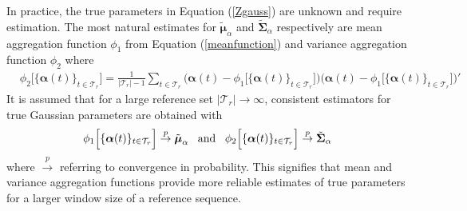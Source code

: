 In practice, the true parameters in Equation (\ref{Zgauss}) are unknown and require estimation.  
 The most natural estimates for $ \tilde{\boldsymbol \mu}_\alpha $ and $ \tilde{\boldsymbol \Sigma}_\alpha$ respectively are  mean aggregation function $ \phi_1$ from Equation (\ref{meanfunction})
and  variance aggregation function $ \phi_2$  where
\begin{align}
 &\phi_2 \Big[ \{ {\boldsymbol \alpha}(t)  \}_{t \in \mathcal{T}_{r}}   \Big]= \frac{1}{ |\mathcal{T}_{r}| -1 }  
  \underset{ t \in \mathcal{T}_{r} }{\sum}
 \Big({  {\boldsymbol \alpha}(t) -  \phi_1 \Big[\{ {\boldsymbol \alpha}(t) } \}_{t \in \mathcal{T}_{r}}   \Big] \Big) 
  \Big( {\boldsymbol \alpha}(t) -  \phi_1 \Big[\{ {\boldsymbol \alpha}(t)  \}_{t \in \mathcal{T}_{r}}   \Big] \Big)'   \label{varfunction}
 \end{align}
 It is assumed that for a large reference set $|\mathcal{T}_r| \to \infty$, %
  consistent estimators for   true Gaussian  parameters 
   are obtained with 
\begin{align}
\phi_1 \Big[ \{ {\boldsymbol \alpha}(t)  \}_{t \in \mathcal{T}_{r}}   \Big]  \stackrel{p}{\to}  \tilde{\boldsymbol  \mu}_\alpha     \mbox{ \, and \, }
 \phi_2 \Big[ \{  {\boldsymbol \alpha}(t)  \}_{t \in \mathcal{T}_{r}}   \Big] \stackrel{p}{\to} 
  \tilde{\boldsymbol \Sigma}_\alpha  %
  \label{consistent1} 
\end{align} 
where $\stackrel{p}{\to}$ referring to convergence in probability. 
This  signifies that mean and variance aggregation functions provide more reliable estimates of true parameters for a larger window size of a reference sequence.  



